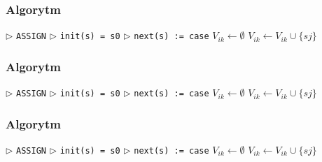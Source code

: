 \documentclass{beamer}
\begin{document}
\begin{frame}[fragile, t]    %

\frametitle{Algorytm}
\begin{algorithmic}
\State $\triangleright$ \verb!ASSIGN!
\State $\triangleright$ \verb!init(s) = s0!
\State $\triangleright$ \verb!next(s) := case!
   		\State $V_{ik} \gets \emptyset$ 
   				\State $V_{ik} \gets V_{ik} \cup\{sj\}$
   			
\end{algorithmic}
 
\end{frame}
 
\begin{frame}[fragile, t]    %

\frametitle{Algorytm}
\begin{algorithmic}
\State $\triangleright$ \verb!ASSIGN!
\State $\triangleright$ \verb!init(s) = s0!
\State $\triangleright$ \verb!next(s) := case!
   		\State $V_{ik} \gets \emptyset$ 
   				\State $V_{ik} \gets V_{ik} \cup\{sj\}$
   			\EndIf
   		
\end{algorithmic}
 
\end{frame}
 
\begin{frame}[fragile, t]    %

\frametitle{Algorytm}
\begin{algorithmic}
\State $\triangleright$ \verb!ASSIGN!
\State $\triangleright$ \verb!init(s) = s0!
\State $\triangleright$ \verb!next(s) := case!
   		\State $V_{ik} \gets \emptyset$ 
   				\State $V_{ik} \gets V_{ik} \cup\{sj\}$
   			\EndIf
   		\EndFor
   		
\end{algorithmic}
 
\end{frame}
 
\end{document}

